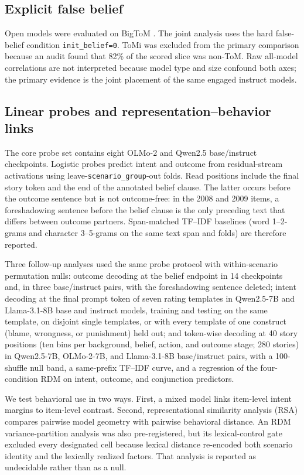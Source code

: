 \documentclass[11pt]{article}
\begin{document}
\subsection{Explicit false belief}

Open models were evaluated on BigToM \citep{gandhi2023bigtom}.
The joint analysis uses the hard false-belief condition \texttt{init\_belief=0}.
ToMi was excluded from the primary comparison because an audit found that 82\% of the scored slice was non-ToM.
Raw all-model correlations are not interpreted because model type and size confound both axes; the primary evidence is the joint placement of the same engaged instruct models.

\subsection{Linear probes and representation--behavior links}

The core probe set contains eight OLMo-2 and Qwen2.5 base/instruct checkpoints.
Logistic probes predict intent and outcome from residual-stream activations using leave-\texttt{scenario\_group}-out folds.
Read positions include the final story token and the end of the annotated belief clause.
The latter occurs before the outcome sentence but is not outcome-free: in the 2008 and 2009 items, a foreshadowing sentence before the belief clause is the only preceding text that differs between outcome partners.
Span-matched TF--IDF baselines (word 1--2-grams and character 3--5-grams on the same text span and folds) are therefore reported.

Three follow-up analyses used the same probe protocol with within-scenario permutation nulls: outcome decoding at the belief endpoint in 14 checkpoints and, in three base/instruct pairs, with the foreshadowing sentence deleted; intent decoding at the final prompt token of seven rating templates in Qwen2.5-7B and Llama-3.1-8B base and instruct models, training and testing on the same template, on disjoint single templates, or with every template of one construct (blame, wrongness, or punishment) held out; and token-wise decoding at 40 story positions (ten bins per background, belief, action, and outcome stage; 280 stories) in Qwen2.5-7B, OLMo-2-7B, and Llama-3.1-8B base/instruct pairs, with a 100-shuffle null band, a same-prefix TF--IDF curve, and a regression of the four-condition RDM on intent, outcome, and conjunction predictors.

We test behavioral use in two ways.
First, a mixed model links item-level intent margins to item-level contrast.
Second, representational similarity analysis (RSA) compares pairwise model geometry with pairwise behavioral distance.
An RDM variance-partition analysis was also pre-registered, but its lexical-control gate excluded every designated cell because lexical distance re-encoded both scenario identity and the lexically realized factors.
That analysis is reported as undecidable rather than as a null.
\end{document}
